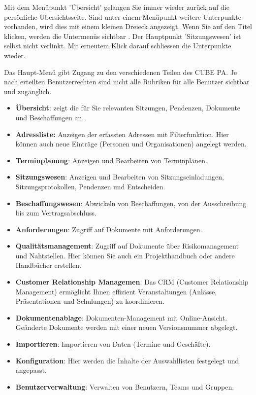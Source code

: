\vspace{\baselineskip}

Mit dem Menüpunkt 'Übersicht'  gelangen Sie immer wieder zurück auf die persönliche Übersichtsseite. Sind unter einem Menüpunkt weitere Unterpunkte vorhanden, wird dies mit einem kleinen Dreieck angezeigt. Wenn Sie auf den Titel klicken, werden die Untermenüs sichtbar . Der Hauptpunkt 'Sitzungswesen' ist selbst nicht verlinkt. Mit erneutem Klick darauf schliessen die Unterpunkte wieder.

\vspace{\baselineskip}

Das Haupt-Menü gibt Zugang zu den verschiedenen Teilen des CUBE PA. Je nach erteilten Benutzerrechten sind nicht alle Rubriken für alle Benutzer sichtbar und zugänglich.

\begin{itemize}
\item
\textbf{Übersicht}: zeigt die für Sie relevanten Sitzungen, Pendenzen, Dokumente und Beschaffungen an.
\item
\textbf{Adressliste: }Anzeigen der erfassten Adressen mit Filterfunktion. Hier können auch neue Einträge (Personen und Organisationen) angelegt werden.
\item
\textbf{Terminplanung}: Anzeigen und Bearbeiten von Terminplänen.
\item
\textbf{Sitzungswesen}: Anzeigen und Bearbeiten von Sitzungseinladungen, Sitzungsprotokollen, Pendenzen und
Entscheiden.
\item
\textbf{Beschaffungswesen}: Abwickeln von Beschaffungen, von der Ausschreibung bis zum Vertragsabschluss.
\item
\textbf{Anforderungen}: Zugriff auf Dokumente mit Anforderungen.
\item
\textbf{Qualitätsmanagement}: Zugriff auf Dokumente über Risikomanagement und Nahtstellen. Hier können Sie auch ein Projekthandbuch oder andere Handbücher erstellen.
\item
\textbf{Customer Relationship Managemen}: Das CRM (Customer Relationship Management) ermöglicht Ihnen effizient Veranstaltungen (Anlässe, Präsentationen und Schulungen) zu koordinieren.
\item
\textbf{Dokumentenablage}: Dokumenten-Management mit Online-Ansicht. Geänderte Dokumente werden mit einer neuen Versionsnummer abgelegt.
\item
\textbf{Importieren}: Importieren von Daten (Termine und Geschäfte).
\item
\textbf{Konfiguration}: Hier werden die Inhalte der Auswahllisten festgelegt und angepasst.
\item
\textbf{Benutzerverwaltung}: Verwalten von Benutzern, Teams und Gruppen.
\end{itemize}

